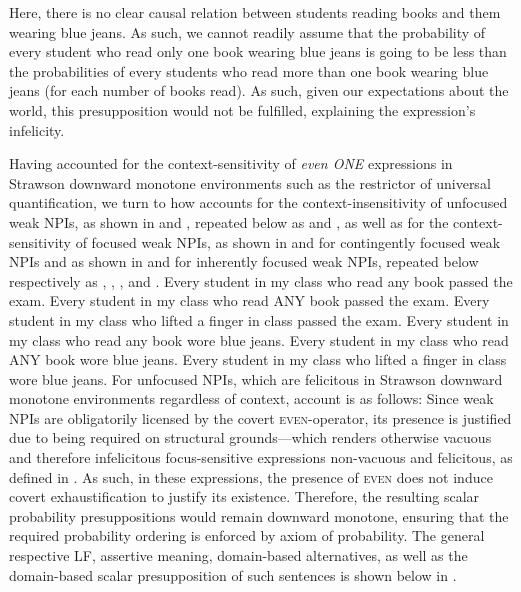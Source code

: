 \xe
Here, there is no clear causal relation between students reading books and them wearing blue jeans. As such, we cannot readily assume that the probability of every student who read only one book wearing blue jeans is going to be less than the probabilities of every students who read more than one book wearing blue jeans (for each number of books read). As such, given our expectations about the world, this presupposition would not be fulfilled, explaining the expression's infelicity.

Having accounted for the context-sensitivity of \textit{even \MakeUppercase{one}} expressions in Strawson downward monotone environments such as the restrictor of universal quantification, we turn to how \textcite{Crnic2014-dogma} accounts for the context-insensitivity of unfocused weak NPIs, as shown in  and , repeated below as  and , as well as for the context-sensitivity of focused weak NPIs, as shown in  and  for contingently focused weak NPIs and as shown in  and  for inherently focused weak NPIs, repeated below respectively as , , , and .
\pex\label{ex:npi-every-okay-repeat}
\a Every student in my class who read any book passed the exam.
\a Every student in my class who read \MakeUppercase{any} book passed the exam.
\a Every student in my class who lifted a finger in class passed the exam.
\xe
\pex\label{ex:npi-every-bad-repeat}
\a Every student in my class who read any book wore blue jeans.
\a\ljudge{\#} Every student in my class who read \MakeUppercase{any} book wore blue jeans.
\a\ljudge{\#} Every student in my class who lifted a finger in class wore blue jeans.
\xe
For unfocused NPIs, which are felicitous in Strawson downward monotone environments regardless of context,  account is as follows: Since weak NPIs are obligatorily licensed by the covert {\scshape even}-operator, its presence is justified due to being required on structural grounds---which renders otherwise vacuous and therefore infelicitous focus-sensitive expressions non-vacuous and felicitous, as defined in . As such, in these expressions, the presence of {\scshape even} does not induce covert exhaustification to justify its existence. Therefore, the resulting scalar probability presuppositions would remain downward monotone, ensuring that the required probability ordering is enforced by  axiom of probability. The general respective LF, assertive meaning, domain-based alternatives, as well as the domain-based scalar presupposition of such sentences is shown below in .

